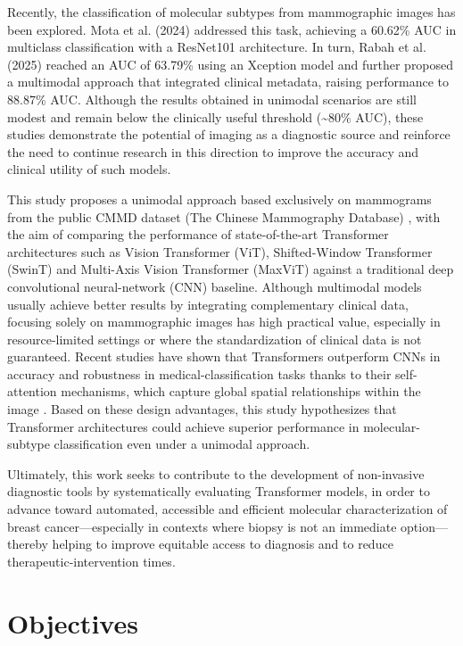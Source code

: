 \documentclass[a4paper,10pt]{book}
\begin{document}
Recently, the classification of molecular subtypes from mammographic images has been explored. Mota et al. (2024) \cite{mota_breast_2024} addressed this task, achieving a 60.62\% AUC in multiclass classification with a ResNet101 architecture. In turn, Rabah et al. (2025) \cite{ben_rabah_multimodal_2025} reached an AUC of 63.79\% using an Xception model and further proposed a multimodal approach that integrated clinical metadata, raising performance to 88.87\% AUC. Although the results obtained in unimodal scenarios are still modest and remain below the clinically useful threshold (\textasciitilde80\% AUC), these studies demonstrate the potential of imaging as a diagnostic source and reinforce the need to continue research in this direction to improve the accuracy and clinical utility of such models.

This study proposes a unimodal approach based exclusively on mammograms from the public CMMD dataset (The Chinese Mammography Database) \cite{cai_online_2023}, with the aim of comparing the performance of state-of-the-art Transformer architectures such as Vision Transformer (ViT), Shifted-Window Transformer (SwinT) and Multi-Axis Vision Transformer (MaxViT) against a traditional deep convolutional neural-network (CNN) baseline. Although multimodal models usually achieve better results by integrating complementary clinical data, focusing solely on mammographic images has high practical value, especially in resource-limited settings or where the standardization of clinical data is not guaranteed. Recent studies have shown that Transformers outperform CNNs in accuracy and robustness in medical-classification tasks thanks to their self-attention mechanisms, which capture global spatial relationships within the image \cite{mauricio_comparing_2023}. Based on these design advantages, this study hypothesizes that Transformer architectures could achieve superior performance in molecular-subtype classification even under a unimodal approach.

Ultimately, this work seeks to contribute to the development of non-invasive diagnostic tools by systematically evaluating Transformer models, in order to advance toward automated, accessible and efficient molecular characterization of breast cancer—especially in contexts where biopsy is not an immediate option—thereby helping to improve equitable access to diagnosis and to reduce therapeutic-intervention times.

\section{Objectives}
\end{document}
